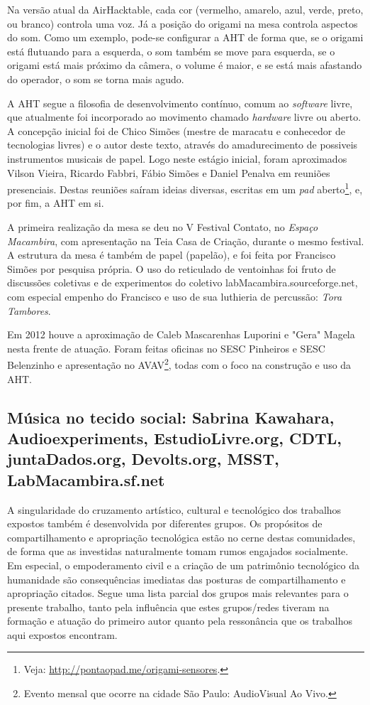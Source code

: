 Na versão atual da AirHacktable, cada cor (vermelho, amarelo, azul,
verde, preto, ou branco) controla uma voz. Já a posição do origami na
mesa controla aspectos do som. Como um exemplo, pode-se
configurar a AHT de forma que, se o origami está
flutuando para a esquerda, o som também se move para esquerda, se
o origami está mais próximo da câmera, o volume é maior, e se está
mais afastando do operador, o som se torna mais agudo.

A AHT segue a filosofia de desenvolvimento contínuo, comum ao \emph{software}
livre, que atualmente foi incorporado ao movimento chamado \emph{hardware}
livre ou aberto. A concepção inicial foi de Chico Simões (mestre de maracatu
e conhecedor de tecnologias livres) e o autor
deste texto, através do amadurecimento de possiveis instrumentos musicais de papel. 
Logo neste estágio inicial, foram aproximados Vilson Vieira, Ricardo Fabbri, Fábio Simões
e Daniel Penalva em reuniões presenciais. Destas reuniões saíram ideias
diversas, escritas em um \emph{pad} aberto\footnote{Veja: \url{http://pontaopad.me/origami-sensores}.},
e, por fim, a AHT em si.

A primeira realização da mesa se deu no V Festival Contato, no \emph{Espaço Macambira},
com apresentação na Teia Casa de Criação, durante o mesmo festival. A estrutura
da mesa é também de papel (papelão), e foi feita
por Francisco Simões por pesquisa própria. O uso do reticulado de ventoinhas foi fruto
de discussões coletivas e de experimentos do coletivo labMacambira.sourceforge.net,
com especial empenho do Francisco e uso de sua luthieria de percussão: \emph{Tora Tambores}.

Em 2012 houve a aproximação de Caleb Mascarenhas Luporini e "Gera" Magela nesta frente de atuação.
Foram feitas oficinas no SESC Pinheiros e SESC Belenzinho e apresentação
no AVAV\footnote{Evento mensal que ocorre na cidade São Paulo: AudioVisual Ao Vivo.},
todas com o foco na construção e uso da AHT.


\subsection{Música no tecido social: Sabrina Kawahara, Audioexperiments, EstudioLivre.org, CDTL, juntaDados.org, Devolts.org, MSST, LabMacambira.sf.net}

A singularidade do cruzamento artístico, cultural e tecnológico
dos trabalhos expostos também é desenvolvida por diferentes grupos.
Os propósitos de compartilhamento e apropriação tecnológica estão no
cerne destas comunidades, de forma que as investidas naturalmente tomam
rumos engajados socialmente. Em especial, o empoderamento civil e
a criação de um patrimônio tecnológico da humanidade são consequências
imediatas das posturas de compartilhamento e apropriação citados. Segue uma lista parcial dos grupos mais relevantes para o presente trabalho, tanto pela influência que estes grupos/redes tiveram na formação e atuação do primeiro autor quanto pela ressonância que os trabalhos aqui expostos encontram.

